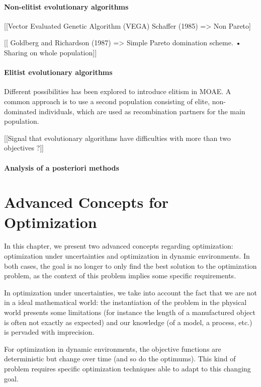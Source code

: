 \subsubsection{Non-elitist evolutionary algorithms}

[[Vector Evaluated Genetic Algorithm (VEGA) Schaffer (1985) => Non Pareto]

[[  Goldberg and Richardson (1987) =>  Simple Pareto domination scheme. • Sharing on whole population]]


\subsubsection{Elitist evolutionary algorithms}

Different possibilities has been explored to introduce elitism in MOAE. A common approach is to use a second population consisting of elite, non-dominated individuals, which are used as recombination partners for the main population.

[[Signal that evolutionary algorithms have difficulties with more than two objectives ?]]

\subsubsection{Analysis of a posteriori methods}

\chapter{Advanced Concepts for Optimization}

In this chapter, we present two advanced concepts regarding optimization: optimization under uncertainties and optimization in dynamic environments. In both cases, the goal is no longer to only find the best solution to the optimization problem, as the context of this problem implies some specific requirements.

In optimization under uncertainties, we take into account the fact that we are not in a ideal mathematical world: the instantiation of the problem in the physical world presents some limitations (for instance the length of a manufactured object is often not exactly as expected) and our knowledge (of a model, a process, etc.) is pervaded with imprecision.

For optimization in dynamic environments, the objective functions are deterministic but change over time (and so do the optimums). This kind of problem requires specific optimization techniques able to adapt to this changing goal.

